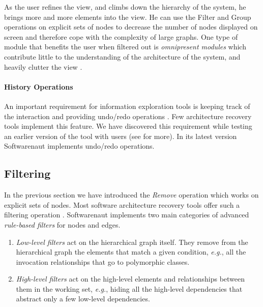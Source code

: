 \documentclass[preprint,12pt]{elsarticle}
\newcommand{\eg}{\emph{e.g.},\xspace}
\begin{document}
As the user refines the view, and climbs down the hierarchy of the system, he brings more and more elements into the view. He can use the Filter and Group operations on explicit sets of nodes to decrease the number of nodes displayed on screen and therefore cope with the complexity of large graphs. One type of module that benefits the user when filtered out is {\em omnipresent modules} which contribute little to the understanding of the architecture of the system, and heavily clutter the view \cite{mitchell-bunch}.


\paragraph {History Operations} An important requirement for information exploration tools is keeping track of the interaction and providing undo/redo operations \cite{shneid-eyes}. Few architecture recovery tools implement this feature. We have discovered this requirement while testing an earlier version of the tool with users (see  for more). In its latest version Softwarenaut implements undo/redo operations.


\subsection {Filtering} 

In the previous section we have introduced the {\em Remove} operation which works on explicit sets of nodes. Most software architecture recovery tools offer such a filtering operation \cite{aracic-filtering}. 
Softwarenaut implements two main categories of advanced {\em rule-based filters} for nodes and edges. 

\begin{enumerate}

\item {\em Low-level filters} act on the hierarchical graph itself. They remove from the hierarchical graph the elements that match a given condition, \eg all the invocation relationships that go to polymorphic classes.

\item {\em High-level filters} act on the high-level elements and relationships between them in the working set, \eg hiding all the high-level dependencies that abstract only a few low-level dependencies.

\end{enumerate}
\end{document}
